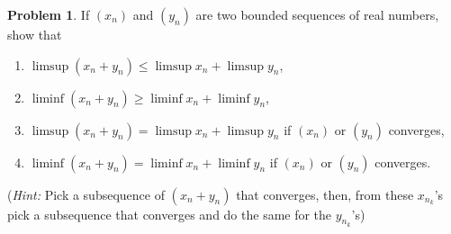 \documentclass{amsart}
\theoremstyle{definition}
\newtheorem{problem}{Problem}
\begin{document}
\begin{problem}
    If $(x_n)$ and $(y_n)$ are two bounded sequences of real numbers, show that
    \begin{enumerate}[label = (\alph*)]
        \item $\limsup (x_n + y_n) \leq \limsup x_n + \limsup y_n$,
        \item $\liminf (x_n + y_n) \geq \liminf x_n + \liminf y_n$,
        \item $\limsup (x_n + y_n) = \limsup x_n + \limsup y_n$ if $(x_n)$ or $(y_n)$ converges,
        \item $\liminf (x_n + y_n) = \liminf x_n + \liminf y_n$ if $(x_n)$ or $(y_n)$ converges. 
    \end{enumerate}    
    (\textit{Hint:} Pick a subsequence of $(x_n + y_n)$ that converges, then, from these $x_{n_k}$’s pick a subsequence that converges and do the same for the $y_{n_k}$’s)
\end{problem}
\end{document}
